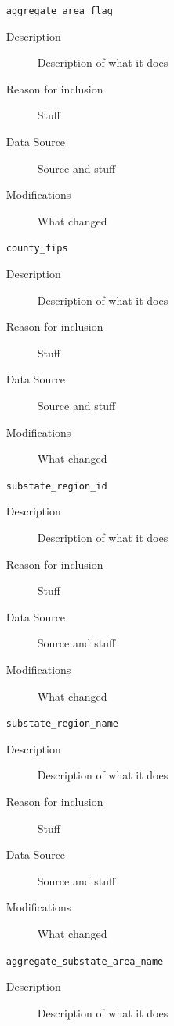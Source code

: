 \documentclass{article}
\begin{document}
\begin{itemize}[label={}, align=left]
    \item[\texttt{aggregate\_area\_flag}] \
          \begin{description}
              \item[Description] Description of what it does
              \item[Reason for inclusion] Stuff
              \item[Data Source] Source and stuff
              \item[Modifications] What changed
          \end{description}
    \item[\texttt{county\_fips}] \
          \begin{description}
              \item[Description] Description of what it does
              \item[Reason for inclusion] Stuff
              \item[Data Source] Source and stuff
              \item[Modifications] What changed
          \end{description}
    \item[\texttt{substate\_region\_id}] \
          \begin{description}
              \item[Description] Description of what it does
              \item[Reason for inclusion] Stuff
              \item[Data Source] Source and stuff
              \item[Modifications] What changed
          \end{description}
    \item[\texttt{substate\_region\_name}] \
          \begin{description}
              \item[Description] Description of what it does
              \item[Reason for inclusion] Stuff
              \item[Data Source] Source and stuff
              \item[Modifications] What changed
          \end{description}
    \item[\texttt{aggregate\_substate\_area\_name}] \
          \begin{description}
              \item[Description] Description of what it does

\end{description}
\end{itemize}
\end{document}
